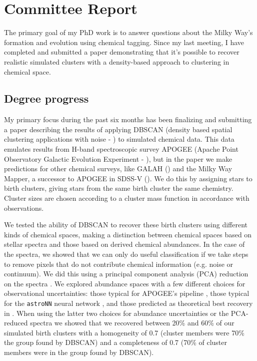 \documentclass[11pt]{article}
\begin{document}
    
    \section*{Committee Report}
    
    The primary goal of my PhD work is to answer questions about the Milky Way's formation and evolution using chemical tagging. Since my last meeting, I have completed and submitted a paper demonstrating that it's possible to recover realistic simulated clusters with a density-based approach to clustering in chemical space.    

    \subsection*{Degree progress}

	My primary focus during the past six months has been finalizing and submitting a paper describing the results of applying DBSCAN (density based spatial clustering applications with noise - \citealt{Ester1996}) to simulated chemical data. This data emulates results from H-band spectroscopic survey APOGEE (Apache Point Observatory Galactic Evolution Experiment - \citealt{Majewski2017}), but in the paper we make predictions for other chemical surveys, like GALAH () and the Milky Way Mapper, a successor to APOGEE in SDSS-V (). We do this by assigning stars to birth clusters, giving stars from the same birth cluster the same chemistry. Cluster sizes are chosen according to a cluster mass function in accordance with observations.
	
	We tested the ability of DBSCAN  to recover these birth clusters using different kinds of chemical spaces, making a distinction between chemical spaces based on stellar spectra and those based on derived chemical abundances. In the case of the spectra, we showed that we can only do useful classification if we take steps to remove pixels that do not contribute chemical information (e.g. noise or continuum). We did this using a principal component analysis (PCA) reduction on the spectra \cite{bla}. We explored abundance spaces with a few different choices for observational uncertainties: those typical for APOGEE's pipeline \citep{Abolfathi2018}, those typical for the \texttt{astroNN} neural network \citep{Leung2018}, and those predicted as theoretical best recovery in \citep{Ting2016b}. When using the latter two choices for abundance uncertainties or the PCA-reduced spectra we showed that we recovered between 20\% and 60\% of our simulated birth clusters with a homogeneity of 0.7 (cluster members were 70\% the group found by DBSCAN) and a completeness of 0.7 (70\% of cluster members were in the group found by DBSCAN). 
	
\end{document}
